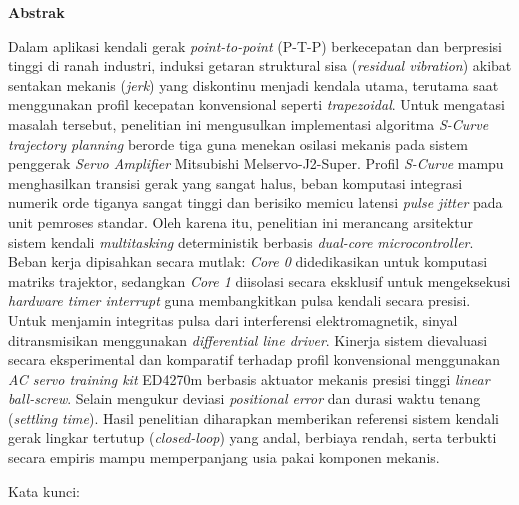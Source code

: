 
\clearpage
{}
{}
\begin{center}
    \textbf{\large Abstrak}\\[3em]
\end{center}

\vspace{0.2cm}

Dalam aplikasi kendali gerak \textit{point-to-point} (P-T-P) berkecepatan dan
berpresisi tinggi di ranah industri, induksi getaran struktural sisa
(\textit{residual vibration}) akibat sentakan mekanis (\textit{jerk}) yang
diskontinu menjadi kendala utama, terutama saat menggunakan profil kecepatan
konvensional seperti \textit{trapezoidal}. Untuk mengatasi masalah tersebut,
penelitian ini mengusulkan implementasi algoritma \textit{S-Curve trajectory
planning} berorde tiga guna menekan osilasi mekanis pada sistem penggerak
\textit{Servo Amplifier} Mitsubishi Melservo-J2-Super. Profil \textit{S-Curve}
mampu menghasilkan transisi gerak yang sangat halus, beban komputasi integrasi
numerik orde tiganya sangat tinggi dan berisiko memicu latensi \textit{pulse
jitter} pada unit pemroses standar. Oleh karena itu, penelitian ini merancang
arsitektur sistem kendali \textit{multitasking} deterministik berbasis
\textit{dual-core microcontroller}. Beban kerja dipisahkan secara mutlak:
\textit{Core 0} didedikasikan untuk komputasi matriks trajektor, sedangkan
\textit{Core 1} diisolasi secara eksklusif untuk mengeksekusi \textit{hardware
timer interrupt} guna membangkitkan pulsa kendali secara presisi. Untuk menjamin
integritas pulsa dari interferensi elektromagnetik, sinyal ditransmisikan
menggunakan \textit{differential line driver}. Kinerja sistem dievaluasi secara
eksperimental dan komparatif terhadap profil konvensional menggunakan \textit{AC
servo training kit} ED4270m berbasis aktuator mekanis presisi tinggi
\textit{linear ball-screw}. Selain mengukur deviasi \textit{positional error}
dan durasi waktu tenang (\textit{settling time}). Hasil
penelitian diharapkan memberikan referensi sistem kendali gerak lingkar tertutup
(\textit{closed-loop}) yang andal, berbiaya rendah, serta terbukti secara
empiris mampu memperpanjang usia pakai komponen mekanis.

\vspace{0.5cm}

\noindent Kata kunci: \katakunci